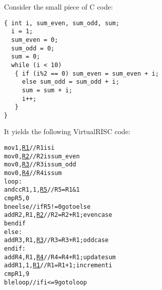 \begin{slide*}
Consider the small piece of C code:

\begin{scriptsize}
\begin{verbatim}
{ int i, sum_even, sum_odd, sum;
  i = 1;
  sum_even = 0;
  sum_odd = 0;
  sum = 0;
  while (i < 10)
   { if (i%2 == 0) sum_even = sum_even + i;
     else sum_odd = sum_odd + i;
     sum = sum + i;
     i++;
   }
}
\end{verbatim}
\end{scriptsize}
It yields the following VirtualRISC code:
\begin{scriptsize}
\begin{alltt}
        mov 1,\underline{R1}          // R1 is i
        mov 0,\underline{R2}          // R2 is sum_even
        mov 0,\underline{R3}          // R3 is sum_odd
        mov 0,\underline{R4}          // R4 is sum
loop:
        andcc R1,1,\underline{R5}    // R5 = R1 & 1
        cmp R5,0
        bne else         // if R5 != 0 goto else
        add R2,R1,\underline{R2}     // R2 = R2 + R1; even case
        b endif
else:
        add R3,R1,\underline{R3}     // R3 = R3 + R1; odd case
endif:
        add R4,R1,\underline{R4}     // R4 = R4 + R1; update sum
        add R1,1,\underline{R1}      // R1 = R1 + 1;  increment i
        cmp R1,9 
        ble loop         // if i <= 9 goto loop
\end{alltt}
\end{scriptsize}
\vfil
\end{slide*}
 
